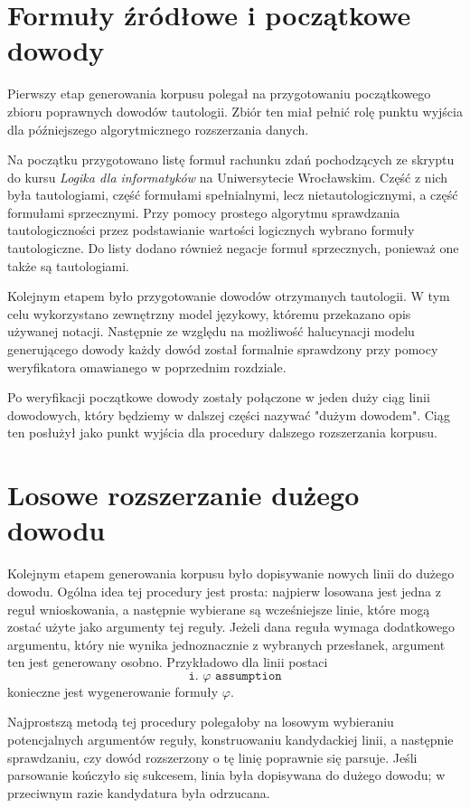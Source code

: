 \documentclass[shortabstract]{iithesis}
\theoremstyle{definition}
\theoremstyle{remark}
\theoremstyle{plain}
\begin{document}
\section{Formuły źródłowe i początkowe dowody}

Pierwszy etap generowania korpusu polegał na przygotowaniu początkowego zbioru
poprawnych dowodów tautologii. Zbiór ten miał pełnić rolę punktu wyjścia dla
późniejszego algorytmicznego rozszerzania danych.

Na początku przygotowano listę formuł rachunku zdań pochodzących ze skryptu do
kursu \emph{Logika dla informatyków} na Uniwersytecie Wrocławskim. Część z nich była
tautologiami, część formułami spełnialnymi, lecz nietautologicznymi, a część formułami
sprzecznymi. Przy pomocy prostego algorytmu sprawdzania tautologiczności przez
podstawianie wartości logicznych wybrano formuły tautologiczne. Do listy dodano
również negacje formuł sprzecznych, ponieważ one także są tautologiami.

Kolejnym etapem było przygotowanie dowodów otrzymanych tautologii. 
W tym celu wykorzystano zewnętrzny model językowy, któremu przekazano opis używanej
notacji. Następnie ze względu na możliwość halucynacji modelu generującego dowody 
każdy dowód został formalnie sprawdzony przy pomocy weryfikatora omawianego w poprzednim rozdziale.

Po weryfikacji początkowe dowody zostały połączone w jeden duży ciąg linii
dowodowych, który będziemy w dalszej części nazywać "dużym dowodem". Ciąg ten posłużył jako punkt wyjścia dla procedury dalszego
rozszerzania korpusu.
\section{Losowe rozszerzanie dużego dowodu}

Kolejnym etapem generowania korpusu było dopisywanie nowych linii do dużego
dowodu. Ogólna idea tej procedury jest prosta: najpierw losowana jest jedna z reguł
wnioskowania, a następnie wybierane są wcześniejsze linie, które mogą zostać użyte
jako argumenty tej reguły. Jeżeli dana reguła wymaga dodatkowego argumentu, który
nie wynika jednoznacznie z wybranych przesłanek, argument ten jest generowany
osobno. Przykładowo dla linii postaci
\[
\texttt{i. } \varphi \texttt{    assumption}
\]
konieczne jest wygenerowanie formuły \(\varphi\).

Najprostszą metodą tej procedury polegałoby na losowym wybieraniu potencjalnych
argumentów reguły, konstruowaniu kandydackiej linii, a następnie sprawdzaniu, czy
dowód rozszerzony o tę linię poprawnie się parsuje. Jeśli parsowanie kończyło się
sukcesem, linia była dopisywana do dużego dowodu; w przeciwnym razie kandydatura
była odrzucana.
\end{document}
